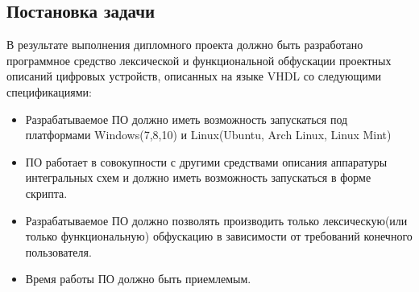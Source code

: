 \subsection{Постановка задачи}
В результате выполнения дипломного проекта должно быть разработано программное средство лексической и функциональной обфускации проектных описаний цифровых устройств, описанных на языке VHDL со следующими спецификациями:
\begin{itemize}
\item Разрабатываемое ПО должно иметь возможность запускаться под платформами Windows(7,8,10) и Linux(Ubuntu, Arch Linux, Linux Mint)
\item ПО работает в совокупности с другими средствами описания аппаратуры интегральных схем и должно иметь возможность запускаться в форме скрипта.
\item Разрабатываемое ПО должно позволять производить только лексическую(или только функциональную) обфускацию в зависимости от требований конечного пользователя.
\item Время работы ПО должно быть приемлемым.
\end{itemize}


